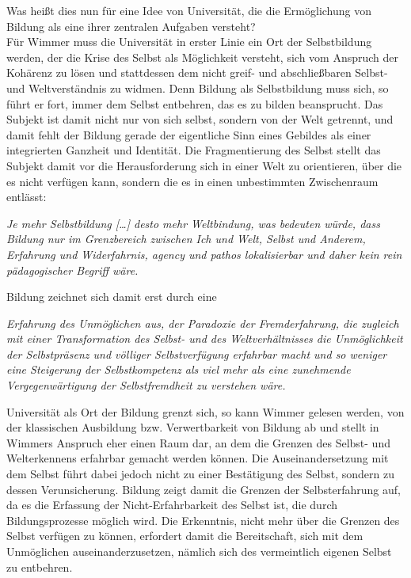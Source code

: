 \noindent Was heißt dies nun für eine Idee von Universität,
die die Ermöglichung von Bildung als eine ihrer zentralen Aufgaben versteht?\\

Für Wimmer muss die Universität in erster Linie ein Ort der Selbstbildung
werden, der die Krise des Selbst als Möglichkeit versteht, sich vom Anspruch
der Kohärenz zu lösen und stattdessen dem nicht greif- und abschließbaren
Selbst- und Weltverständnis zu widmen.  Denn Bildung als Selbstbildung muss
sich, so führt er fort, immer dem Selbst entbehren, das es zu bilden
beansprucht. Das Subjekt ist damit nicht nur von sich selbst, sondern von der
Welt getrennt, und damit fehlt der Bildung \glqq gerade der eigentliche Sinn eines
Gebildes als einer integrierten Ganzheit und Identität.\grqq\footnotemark {}  Die Fragmentierung
des Selbst stellt das Subjekt damit vor die Herausforderung sich in einer Welt
zu orientieren, über die es nicht verfügen kann, sondern die es in einen
unbestimmten Zwischenraum entlässt: 
\begin{myenv}
  \textit{ \glqq Je mehr Selbstbildung […] desto mehr
Weltbindung, was bedeuten würde, dass Bildung nur im Grenzbereich zwischen Ich
und Welt, Selbst und Anderem, Erfahrung und Widerfahrnis, agency und pathos
lokalisierbar und daher kein rein pädagogischer Begriff wäre.\grqq}\footnotemark {}  
\end{myenv}
Bildung
zeichnet sich damit erst durch eine 
\begin{myenv}
  \textit{\glqq [...]Erfahrung des Unmöglichen aus, der
Paradoxie der Fremderfahrung, die zugleich mit einer Transformation des Selbst-
und des Weltverhältnisses die Unmöglichkeit der Selbstpräsenz und völliger
Selbstverfügung erfahrbar macht und so weniger eine Steigerung der
Selbstkompetenz als viel mehr als eine zunehmende Vergegenwärtigung der
Selbstfremdheit zu verstehen wäre.\grqq}\footnotemark {}  
\end{myenv}
Universität als Ort der Bildung grenzt sich, so kann Wimmer gelesen werden, von
der klassischen Ausbildung bzw. Verwertbarkeit von Bildung ab und stellt in
Wimmers Anspruch eher einen Raum dar, an dem die Grenzen des Selbst- und
Welterkennens erfahrbar gemacht werden können. Die Auseinandersetzung mit dem
Selbst führt dabei jedoch nicht zu einer Bestätigung des Selbst, sondern zu
dessen Verunsicherung. Bildung zeigt damit die Grenzen der Selbsterfahrung auf,
da es die Erfassung der Nicht-Erfahrbarkeit des Selbst ist, die durch
Bildungsprozesse möglich wird. Die Erkenntnis, nicht mehr über die Grenzen des
Selbst verfügen zu können, erfordert damit die Bereitschaft, sich mit dem
Unmöglichen auseinanderzusetzen, nämlich sich des vermeintlich eigenen Selbst
zu entbehren.\\  


